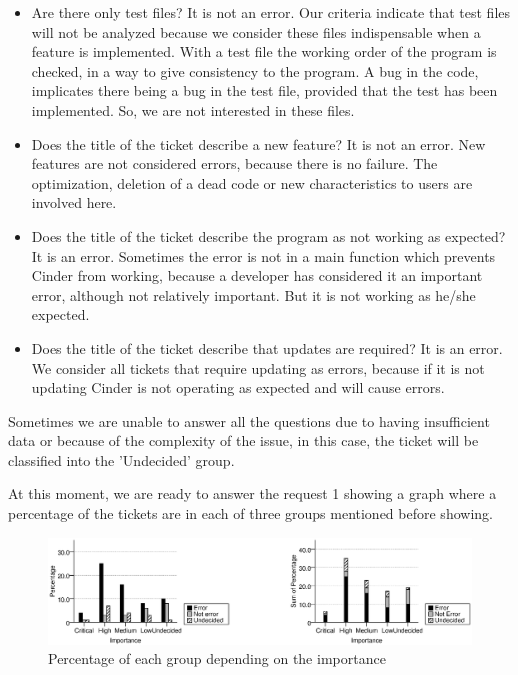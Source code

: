 \documentclass[a4paper]{article}
\begin{document}
\begin{itemize}
    \item Are there only test files? It is not an error. Our criteria indicate that test files will not be analyzed because we consider these files indispensable when a feature is implemented. With a test file the working order of the program is checked, in a way to give consistency to the program. A bug in the code, implicates there being a bug in the test file, provided that the test has been implemented. So, we are not interested in these files. 
    \item Does the title of the ticket describe a new feature? It is not an error. New features are not considered errors, because there is no failure. The optimization, deletion of a dead code or new characteristics to users are involved here. 
    \item Does the title of the ticket describe the program as not working as expected? It is an error. Sometimes the error is not in a main function which prevents Cinder from working, because a developer has considered it an important error, although not relatively important. But it is not working as he/she expected. 
    \item Does the title of the ticket describe that updates are required? It is an error. We consider all tickets that require updating as errors, because if it is not updating Cinder is not operating as expected and will cause errors. 
\end{itemize}

Sometimes we are unable to answer all the questions due to having insufficient data or because of the complexity of the issue, in this case, the ticket will be classified into the 'Undecided' group. 

At this moment, we are ready to answer the request 1 showing a graph where a percentage of the tickets are in each of three groups mentioned before showing. 

\begin{figure}[htb]
\centering
\includegraphics[width=1\textwidth]{firstStage}
\caption{Percentage of each group depending on the importance} \label{fig:firstStage}
\end{figure}
\end{document}
